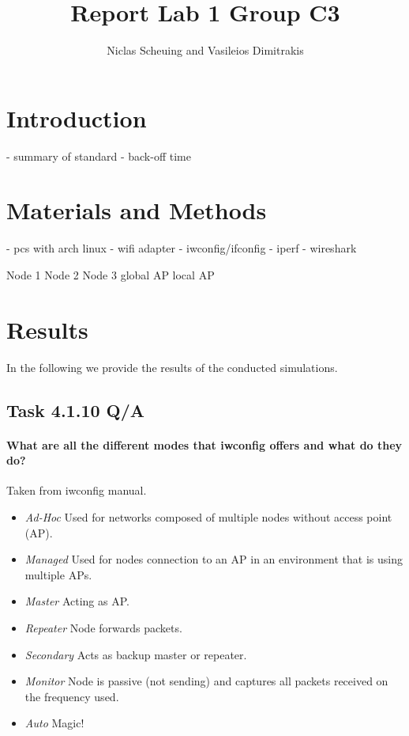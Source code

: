 \documentclass[12pt,a4paper]{article}
\title{Report Lab 1 Group C3}
\author{Niclas Scheuing and Vasileios Dimitrakis}
\begin{document}
\maketitle
\begin{abstract}
\end{abstract}
\section{Introduction}
- summary of standard
- back-off time

\section{Materials and Methods}
- pcs with arch linux
- wifi adapter
- iwconfig/ifconfig
- iperf
- wireshark

Node 1
Node 2
Node 3
global AP
local AP

\section{Results}
In the following we provide the results of the conducted simulations.
\subsection{Task 4.1.10 Q/A}

\paragraph{What are all the different modes that iwconfig offers and what do they do?}
Taken from iwconfig manual\cite{iwconfig:man}.
\begin{itemize}
	\item \emph{Ad-Hoc}
		Used for networks composed of multiple nodes without access point (AP).
	\item \emph{Managed}
		Used for nodes connection to an AP in an environment that is using multiple APs.
	\item \emph{Master}
		Acting as AP.
	\item \emph{Repeater}
		Node forwards packets.
	\item \emph{Secondary}
		Acts as backup master or repeater.
	\item \emph{Monitor}
		Node is passive (not sending) and captures all packets received on the frequency used.
	\item \emph{Auto}
		Magic!
\end{itemize}
\end{document}
